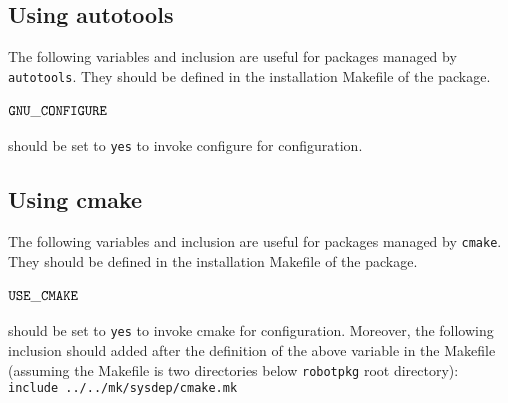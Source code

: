 %
%
%
%
%

\subsection*{Using autotools}

The following variables and inclusion are useful for packages managed by {\tt autotools}. They should be defined in the installation Makefile of the package.

\paragraph{${\tt GNU\_CONFIGURE}$} should be set to {\tt yes} to invoke configure for configuration. 

\subsection*{Using cmake}

The following variables and inclusion are useful for packages managed by {\tt cmake}. They should be defined in the installation Makefile of the package.

\paragraph{${\tt USE\_CMAKE}$} should be set to {\tt yes} to invoke cmake for configuration. Moreover, the following inclusion should added after the definition of the above variable in the Makefile (assuming the Makefile is two directories below {\tt robotpkg} root directory):\\
{\tt include ../../mk/sysdep/cmake.mk}

